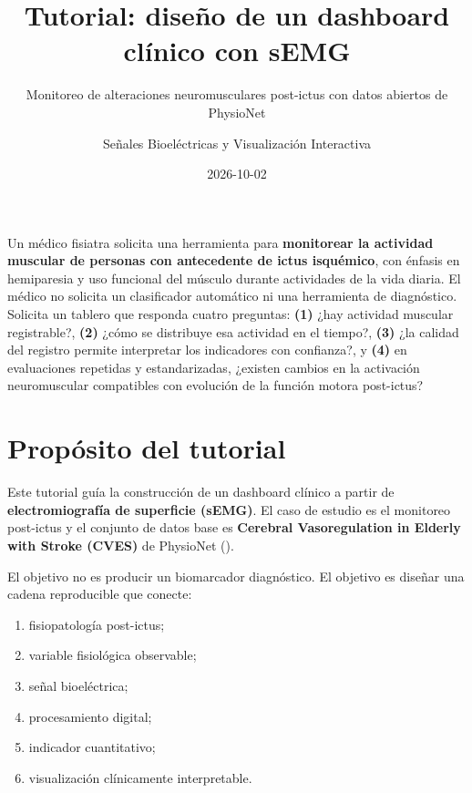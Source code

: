 \documentclass[
  spanish,
  a4paper,
  DIV=11,
  numbers=noendperiod]{scrreprt}
\title{Tutorial: diseño de un dashboard clínico con sEMG}
\subtitle{Monitoreo de alteraciones neuromusculares post-ictus con datos
abiertos de PhysioNet}
\author{Señales Bioeléctricas y Visualización Interactiva}
\date{2026-10-02}
\providecommand{\tightlist}{%
  \setlength{\itemsep}{0pt}\setlength{\parskip}{0pt}}
\renewcommand*\contentsname{Tabla de contenidos}
\newcommand\contentsname{Tabla de contenidos}
\begin{document}
\maketitle

\renewcommand*\contentsname{Tabla de contenidos}
{
\setcounter{tocdepth}{2}
\tableofcontents
}

\begin{tcolorbox}[enhanced jigsaw, arc=.35mm, bottomrule=.15mm, bottomtitle=1mm, breakable, colback=white, colbacktitle=quarto-callout-note-color!10!white, colframe=quarto-callout-note-color-frame, coltitle=black, left=2mm, leftrule=.75mm, opacityback=0, opacitybacktitle=0.6, rightrule=.15mm, title=\textcolor{quarto-callout-note-color}{\faInfo}\hspace{0.5em}{Solicitud clínica}, titlerule=0mm, toprule=.15mm, toptitle=1mm]

Un médico fisiatra solicita una herramienta para
\textbf{monitorear la actividad muscular de personas con antecedente de ictus isquémico},
con énfasis en hemiparesia y uso funcional del músculo durante
actividades de la vida diaria. El médico no solicita un clasificador
automático ni una herramienta de diagnóstico. Solicita un tablero que
responda cuatro preguntas: \textbf{(1)} ¿hay actividad muscular
registrable?, \textbf{(2)} ¿cómo se distribuye esa actividad en el
tiempo?, \textbf{(3)} ¿la calidad del registro permite interpretar los
indicadores con confianza?, y \textbf{(4)} en evaluaciones repetidas y
estandarizadas, ¿existen cambios en la activación neuromuscular
compatibles con evolución de la función motora post-ictus?

\end{tcolorbox}

\chapter{Propósito del tutorial}\label{propuxf3sito-del-tutorial}

Este tutorial guía la construcción de un dashboard clínico a partir de
\textbf{electromiografía de superficie (sEMG)}. El caso de estudio es el
monitoreo post-ictus y el conjunto de datos base es \textbf{Cerebral
Vasoregulation in Elderly with Stroke (CVES)} de PhysioNet
().

El objetivo no es producir un biomarcador diagnóstico. El objetivo es
diseñar una cadena reproducible que conecte:

\begin{enumerate}
\def\labelenumi{\arabic{enumi}.}
\tightlist
\item
  fisiopatología post-ictus;
\item
  variable fisiológica observable;
\item
  señal bioeléctrica;
\item
  procesamiento digital;
\item
  indicador cuantitativo;
\item
  visualización clínicamente interpretable.
\end{enumerate}
\end{document}
